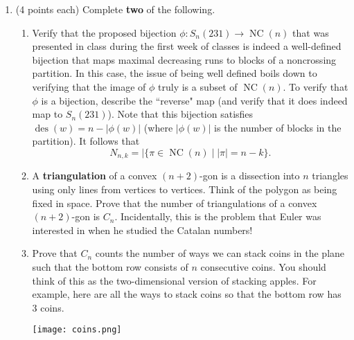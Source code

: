 \documentclass[11pt]{article}
\theoremstyle{definition}
\DeclareMathOperator{\des}{des}
\DeclareMathOperator{\SYT}{SYT}
\DeclareMathOperator{\NC}{NC}
\begin{document}
\begin{enumerate}
\item (4 points each) Complete \textbf{two} of the following.
\begin{enumerate}

\item Verify that the proposed bijection $\phi:S_n(231)\to \NC(n)$ that was presented in class during the first week of classes is indeed a well-defined bijection that maps maximal decreasing runs to blocks of a noncrossing partition. In this case, the issue of being well defined boils down to verifying that the image of $\phi$ truly is a subset of $\NC(n)$.  To verify that $\phi$ is a bijection, describe the ``reverse" map (and verify that it does indeed map to $S_n(231)$).  Note that this bijection satisfies $\des(w)=n-|\phi(w)|$ (where $|\phi(w)|$ is the number of blocks in the partition). It follows that
\[
N_{n,k}=|\{\pi\in\NC(n)\mid |\pi|=n-k\}.
\]


\item A \textbf{triangulation} of a convex $(n+2)$-gon is a dissection into $n$ triangles using only lines from vertices to vertices. Think of the polygon as being fixed in space. Prove that the number of triangulations of a convex $(n+2)$-gon is $C_n$. Incidentally, this is the problem that Euler was interested in when he studied the Catalan numbers!


\item Prove that $C_n$ counts the number of ways we can stack coins in the plane such that the bottom row consists of $n$ consecutive coins.  You should think of this as the two-dimensional version of stacking apples.  For example, here are all the ways to stack coins so that the bottom row has 3 coins.
\begin{center}
\texttt{[image: coins.png]}
\end{center}


\end{enumerate}
\end{enumerate}
\end{document}
